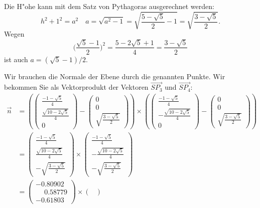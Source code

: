 \begin{loesung}
\begin{teilaufgaben}
\item Die H"ohe kann mit dem Satz von Pythagoras ausgerechnet werden:
\[
h^2+1^2=a^2\quad a=\sqrt{a^2-1}
=
\sqrt{\frac{5-\sqrt{5}}2-1}
=
\sqrt{\frac{3-\sqrt{5}}2}.
\]
Wegen 
\[
\biggl(\frac{\sqrt{5}-1}2\biggr)^2=\frac{5-2\sqrt{5}+1}{4}=\frac{3-\sqrt{5}}2
\]
ist auch $a=(\sqrt{5}-1)/2$.
\item
Wir brauchen die Normale der Ebene durch die genannten Punkte.
Wir bekommen Sie als Vektorprodukt der Vektoren
$\overrightarrow{SP_3}$
und
$\overrightarrow{SP_4}$:
\begin{align*}
\vec n
&=
\left(
\begin{pmatrix}
\frac{-1-\sqrt{5}}4\\
\frac{\sqrt{10-2\sqrt{5}}}4\\
0
\end{pmatrix}
-
\begin{pmatrix}
0\\0\\\sqrt{\frac{3-\sqrt{5}}2}
\end{pmatrix}
\right)
\times
\left(
\begin{pmatrix}
\frac{-1-\sqrt{5}}4\\
-\frac{\sqrt{10-2\sqrt{5}}}4\\
0
\end{pmatrix}
-
\begin{pmatrix}
0\\0\\\sqrt{\frac{3-\sqrt{5}}2}
\end{pmatrix}
\right)
\\
&=
\begin{pmatrix}
\frac{-1-\sqrt{5}}4\\
\frac{\sqrt{10-2\sqrt{5}}}4\\
-\sqrt{\frac{3-\sqrt{5}}2}
\end{pmatrix}
\times
\begin{pmatrix}
\frac{-1-\sqrt{5}}4\\
-\frac{\sqrt{10-2\sqrt{5}}}4\\
-\sqrt{\frac{3-\sqrt{5}}2}
\end{pmatrix}
\\
&=\begin{pmatrix}
  -0.80902\\
  \phantom{-}0.58779\\
  -0.61803   
\end{pmatrix}
\times
\begin{pmatrix}

\end{pmatrix}
\end{align*}
\end{teilaufgaben}
\end{loesung}
